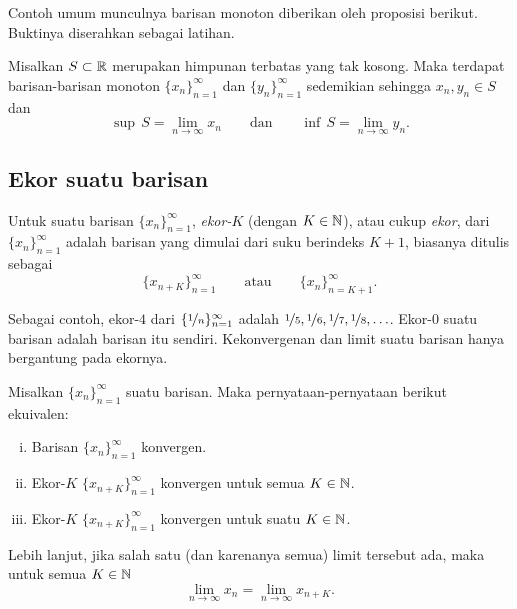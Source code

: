 Contoh umum munculnya barisan monoton diberikan oleh
proposisi berikut.  Buktinya diserahkan sebagai latihan.

\begin{prop} \label{prop:supinfseq}
Misalkan $S \subset {\mathbb{R}}$ merupakan himpunan terbatas yang tak kosong.
Maka terdapat barisan-barisan monoton
$\{ x_n \}_{n=1}^\infty$ dan $\{ y_n \}_{n=1}^\infty$ sedemikian sehingga $x_n, y_n \in S$ dan
\begin{equation*}
\sup\,S = \lim_{n\to \infty} x_n \qquad \text{dan} \qquad \inf\,S =
\lim_{n\to\infty} y_n .
\end{equation*}
\end{prop}

\subsection{Ekor suatu barisan}

\begin{defn}
Untuk suatu barisan $\{ x_n \}_{n=1}^\infty$,
\emph{ekor-$K$} (dengan $K \in {\mathbb{N}}$),
atau cukup
\emph{ekor}, dari
$\{ x_n \}_{n=1}^\infty$ adalah barisan yang dimulai dari suku berindeks $K+1$, biasanya ditulis sebagai
\begin{equation*}
\{ x_{n+K} \}_{n=1}^\infty
\qquad \text{atau} \qquad \{ x_n \}_{n=K+1}^\infty .
\end{equation*}
\end{defn}

Sebagai contoh, ekor-$4$ dari $\{ \nicefrac{1}{n} \}_{n=1}^\infty$ adalah
$\nicefrac{1}{5}, \nicefrac{1}{6}, \nicefrac{1}{7}, \nicefrac{1}{8},
\ldots$.  Ekor-$0$ suatu barisan adalah barisan itu sendiri.
Kekonvergenan dan limit suatu barisan hanya bergantung pada ekornya.

\begin{prop}
Misalkan $\{ x_n \}_{n=1}^\infty$ suatu barisan.  Maka pernyataan-pernyataan
berikut ekuivalen:
\begin{enumerate}[(i)]
\item \label{prop:ktail:i}
Barisan $\{ x_n \}_{n=1}^\infty$ konvergen.
\item \label{prop:ktail:ii}
Ekor-$K$ $\{ x_{n+K} \}_{n=1}^\infty$ konvergen untuk semua $K \in {\mathbb{N}}$.
\item \label{prop:ktail:iii}
Ekor-$K$ $\{ x_{n+K} \}_{n=1}^\infty$ konvergen untuk suatu $K \in {\mathbb{N}}$.
\end{enumerate}
Lebih lanjut, jika salah satu (dan karenanya semua) limit tersebut ada, maka untuk semua $K \in {\mathbb{N}}$
\begin{equation*}
\lim_{n\to \infty} x_n = \lim_{n \to \infty} x_{n+K} .
\end{equation*}
\end{prop}

